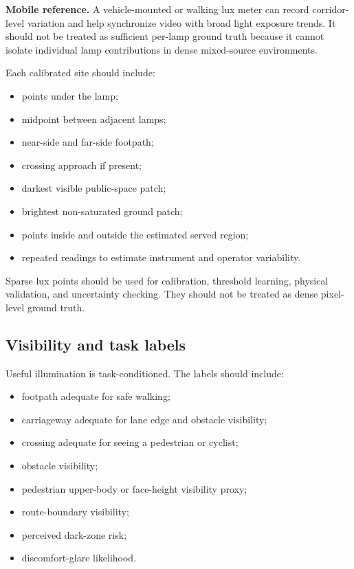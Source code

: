 \documentclass[11pt]{article}
\begin{document}
\textbf{Mobile reference.} A vehicle-mounted or walking lux meter can record corridor-level variation and help synchronize video with broad light exposure trends. It should not be treated as sufficient per-lamp ground truth because it cannot isolate individual lamp contributions in dense mixed-source environments.

Each calibrated site should include:
\begin{itemize}
  \item points under the lamp;
  \item midpoint between adjacent lamps;
  \item near-side and far-side footpath;
  \item crossing approach if present;
  \item darkest visible public-space patch;
  \item brightest non-saturated ground patch;
  \item points inside and outside the estimated served region;
  \item repeated readings to estimate instrument and operator variability.
\end{itemize}

Sparse lux points should be used for calibration, threshold learning, physical validation, and uncertainty checking. They should not be treated as dense pixel-level ground truth.

\subsection{Visibility and task labels}

Useful illumination is task-conditioned. The labels should include:
\begin{itemize}
  \item footpath adequate for safe walking;
  \item carriageway adequate for lane edge and obstacle visibility;
  \item crossing adequate for seeing a pedestrian or cyclist;
  \item obstacle visibility;
  \item pedestrian upper-body or face-height visibility proxy;
  \item route-boundary visibility;
  \item perceived dark-zone risk;
  \item discomfort-glare likelihood.
\end{itemize}
\end{document}
